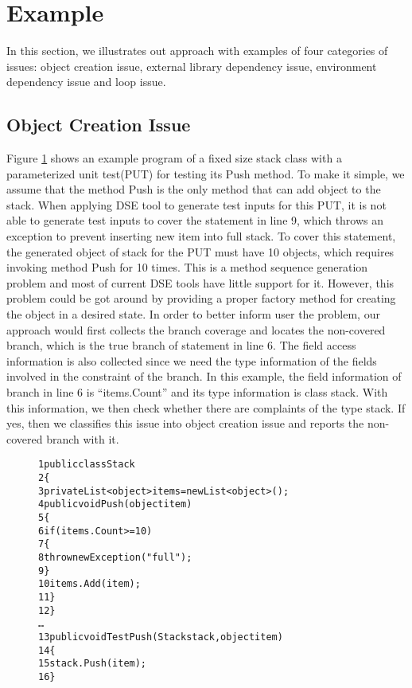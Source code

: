 \section{Example}
In this section, we illustrates out approach with examples of four categories of issues: object creation issue, external library dependency issue, environment dependency issue and loop issue. 
\subsection{Object Creation Issue}
Figure \ref{fig:obj} shows an example program of a fixed size stack class with a parameterized unit test(PUT)\cite{PUT} for testing its Push method. To make it simple, we assume that the method Push is the only method that can add object to the stack. When applying DSE tool to generate test inputs for this PUT, it is not able to generate test inputs to cover the statement in line 9, which throws an exception to prevent inserting new item into full stack. To cover this statement, the generated object of stack for the PUT must have 10 objects, which requires invoking method Push for 10 times. This is a method sequence generation problem and most of current DSE tools have little support for it. However, this problem could be got around by providing a proper factory method\cite{HalleuxT08} for creating the object in a desired state. In order to better inform user the problem, our approach would first collects the branch coverage and locates the non-covered branch, which is the true branch of statement in line 6. The field access information is also collected since we need the type information of the fields involved in the constraint of the branch. In this example, the field information of branch in line 6 is ``items.Count'' and its type information is class stack. With this information, we then check whether there are complaints of the type stack. If yes, then we classifies this issue into object creation issue and reports the non-covered branch with it. 
\begin{figure}
\begin{CodeOut}
\begin{alltt}
1    public class Stack
2    \{
3        private List<object> items = new List<object>();
4        public void Push(object item)
5       \{
6           if (items.Count >= 10)
7          \{
8              throw new Exception("full");
9          \}
10          items.Add(item);
11      \}
12   \}
     \ldots
13   public void TestPush(Stack stack,object item )
14   \{
15       stack.Push(item);            
16   \}
\end{alltt}
\end{CodeOut}
\label{fig:obj}
\end{figure}
